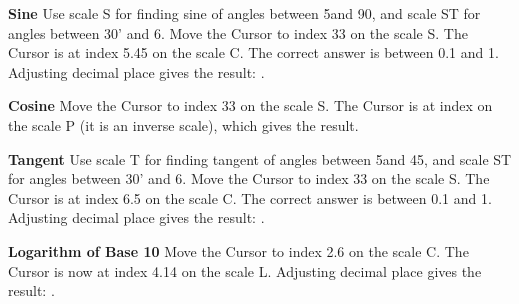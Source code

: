 \begin{multicols*}{3}
{  \textbf{Sine}
\footnotesize Use scale S for finding sine of angles between 5\textdegree and 90\textdegree, and scale ST for angles between 30' and 6\textdegree. \normalsize
{}
Move the Cursor to index 33 on the scale S.
The Cursor is at index 5.45 on the scale C.
The correct answer is between 0.1 and 1. Adjusting decimal place gives the result: .

  \textbf{Cosine}
Move the Cursor to index 33 on the scale S.
The Cursor is at index  on the scale P (it is an inverse scale), which gives the result.

  \textbf{Tangent}
\footnotesize Use scale T for finding tangent of angles between 5\textdegree and 45\textdegree, and scale ST for angles between 30' and 6\textdegree. \normalsize
{}
Move the Cursor to index 33 on the scale S.
The Cursor is at index 6.5 on the scale C.
The correct answer is between 0.1 and 1. Adjusting decimal place gives the result: .

  \textbf{Logarithm of Base 10}
Move the Cursor to index 2.6 on the scale C.
The Cursor is now at index 4.14 on the scale L.
Adjusting decimal place gives the result: .
  }
  \end{multicols*}
  

